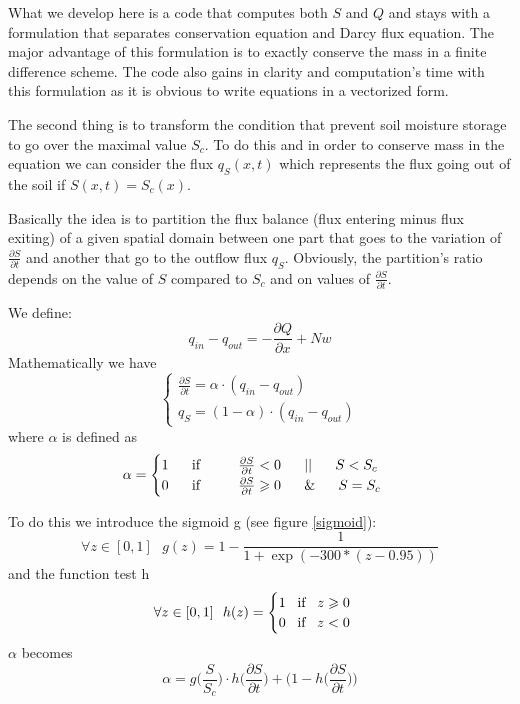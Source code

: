 \documentclass[
journal=jacsat, %
manuscript=article]{achemso}
\begin{document}
What we develop here is a code that computes both $S$ and $Q$ and stays with a formulation that separates conservation equation and Darcy flux equation. The major advantage of this formulation is to exactly conserve the mass in a finite difference scheme. The code also gains in clarity and computation's time with this formulation as it is obvious to write equations in a vectorized form. 

The second thing is to transform the condition that prevent soil moisture storage to go over the maximal value $S_c$. To do this and in order to conserve mass in the equation we can consider the flux $q_{S}(x,t)$ which represents the flux going out of the soil if $S(x,t) = S_{c}(x)$. 

Basically the idea is to partition the flux balance (flux entering minus flux exiting) of a given spatial domain between one part that goes to the variation of $\frac{\partial S}{\partial t}$ and another that go to the outflow flux $q_S$. Obviously, the partition's ratio depends on the value of $S$ compared to $S_c$ and on values of $\frac{\partial S}{\partial t}$.

We define: 
\begin{equation}
    q_{in}-q_{out}=-\frac{\partial Q}{\partial x} + N w
\end{equation}
Mathematically we have
\begin{equation}
\begin{cases}
    \frac{\partial S}{\partial t}  = \alpha \cdot (q_{in}-q_{out}) \\
    q_{S}= (1-\alpha) \cdot (q_{in}-q_{out})
\end{cases}
\end{equation}
where $\alpha$ is defined as
\begin{equation}
    \alpha=\begin{cases}
    1 \; \; \;  \; \; \; \textnormal{if}  \; \; \;  \; \; \; \; \; \; \: \frac{\partial S}{\partial t}<0 \; \; \; \; \; \; || \; \; \; \; \; \; S<S_c\\
    0 \; \; \;  \; \; \; \textnormal{if} \; \; \;  \; \; \; \; \; \; \: \frac{\partial S}{\partial t}\geqslant 0 \; \; \; \; \; \;   \& \; \; \; \; \; \; S=S_c
    \end{cases} 
\end{equation}

To do this we introduce the sigmoid g (see figure \ref{sigmoid}):
\begin{equation}
   \forall z \in [0,1] \: \: \: g(z)=1-\frac{1}{1+\exp (-300*(z-0.95))}
\end{equation}
and the function test h
\begin{equation}
   \forall z \in [0,1] \: \: \: h(z)=\begin{cases}
   1  \; \; \; \textnormal{if} \; \; \; z\geqslant0 \\
   0  \; \; \; \textnormal{if} \; \; \; z <0
   \end{cases}
\end{equation}
$\alpha$ becomes 
\begin{equation}
   \alpha=g\big(\frac{S}{S_{c}}\big)\cdot h\big(\frac{\partial S}{\partial t}\big) + \bigg(1-h\big(\frac{\partial S}{\partial t}\big)\bigg)
\end{equation}
\end{document}
